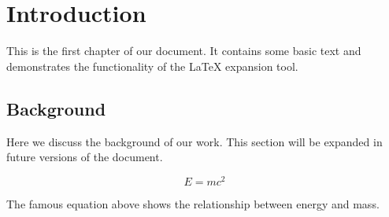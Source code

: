 \section{Introduction}

This is the first chapter of our document. It contains some basic text
and demonstrates the functionality of the LaTeX expansion tool.

\subsection{Background}

Here we discuss the background of our work. This section will be expanded
in future versions of the document.

\begin{equation}
E = mc^2
\end{equation}

The famous equation above shows the relationship between energy and mass.
